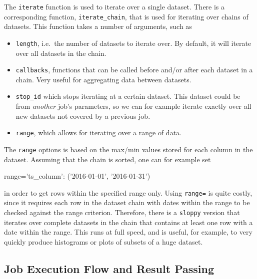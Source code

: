 The \texttt{iterate} function is used to iterate over a single
dataset.  There is a corresponding function, \texttt{iterate\_chain},
that is used for iterating over chains of datasets.  This function
takes a number of arguments, such as
\begin{itemize}
\item[] \texttt{length}, i.e.\ the number of datasets to iterate over.
  By default, it will iterate over all datasets in the chain.
\item[] \texttt{callbacks}, functions that can be called before and/or
  after each dataset in a chain.  Very useful for aggregating data
  between datasets.
\item[] \texttt{stop\_id} which stops iterating at a certain dataset.
  This dataset could be from \textsl{another} job's parameters, so we
  can for example iterate exactly over all new datasets not covered by
  a previous job.
\item[] \texttt{range}, which allows for iterating over a range of
  data.
\end{itemize}
The \texttt{range} options is based on the max/min values stored for
each column in the dataset.  Assuming that the chain is sorted, one
can for example set
\begin{python}
range={'ts_column': ('2016-01-01', '2016-01-31')}
\end{python}
in order to get rows within the specified range only.  Using
\texttt{range=} is quite costly, since it requires each row in the
dataset chain with dates within the range to be checked against the
range criterion.  Therefore, there is a \texttt{sloppy} version that
iterates over complete datasets in the chain that contains at least
one row with a date within the range.  This runs at full speed, and is
useful, for example, to very quickly produce histograms or plots of
subsets of a huge dataset.



\subsection{Job Execution Flow and Result Passing}

